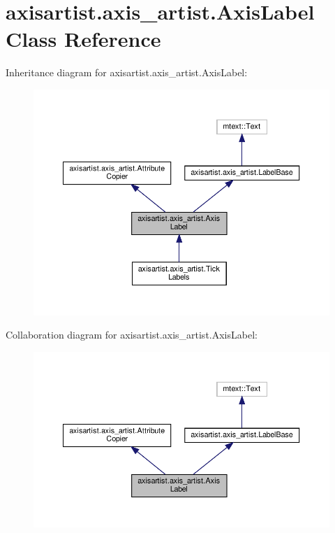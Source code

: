 \hypertarget{classaxisartist_1_1axis__artist_1_1AxisLabel}{}\section{axisartist.\+axis\+\_\+artist.\+Axis\+Label Class Reference}
\label{classaxisartist_1_1axis__artist_1_1AxisLabel}


Inheritance diagram for axisartist.\+axis\+\_\+artist.\+Axis\+Label\+:
\nopagebreak
\begin{figure}[H]
\begin{center}
\leavevmode
\includegraphics[width=350pt]{classaxisartist_1_1axis__artist_1_1AxisLabel__inherit__graph}
\end{center}
\end{figure}


Collaboration diagram for axisartist.\+axis\+\_\+artist.\+Axis\+Label\+:
\nopagebreak
\begin{figure}[H]
\begin{center}
\leavevmode
\includegraphics[width=350pt]{classaxisartist_1_1axis__artist_1_1AxisLabel__coll__graph}
\end{center}
\end{figure}
